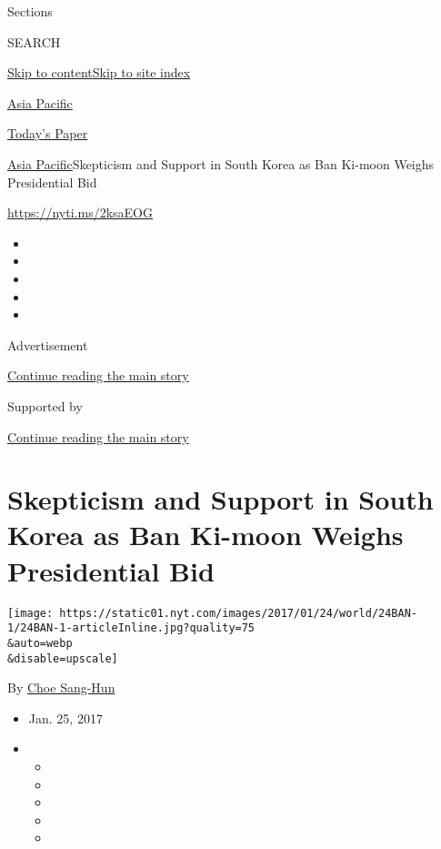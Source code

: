Sections

SEARCH

\protect\hyperlink{site-content}{Skip to
content}\protect\hyperlink{site-index}{Skip to site index}

\href{https://www.nytimes.com/section/world/asia}{Asia Pacific}

\href{https://myaccount.nytimes.com/auth/login?response_type=cookie\&client_id=vi}{}

\href{https://www.nytimes.com/section/todayspaper}{Today's Paper}

\href{/section/world/asia}{Asia Pacific}\textbar{}Skepticism and Support
in South Korea as Ban Ki-moon Weighs Presidential Bid

\url{https://nyti.ms/2ksaEOG}

\begin{itemize}
\item
\item
\item
\item
\item
\end{itemize}

Advertisement

\protect\hyperlink{after-top}{Continue reading the main story}

Supported by

\protect\hyperlink{after-sponsor}{Continue reading the main story}

\hypertarget{skepticism-and-support-in-south-korea-as-ban-ki-moon-weighs-presidential-bid}{%
\section{Skepticism and Support in South Korea as Ban Ki-moon Weighs
Presidential
Bid}\label{skepticism-and-support-in-south-korea-as-ban-ki-moon-weighs-presidential-bid}}

\texttt{[image: https://static01.nyt.com/images/2017/01/24/world/24BAN-1/24BAN-1-articleInline.jpg?quality=75\\\&auto=webp\\\&disable=upscale]}

By \href{http://www.nytimes.com/by/choe-sang-hun}{Choe Sang-Hun}

\begin{itemize}
\item
  Jan. 25, 2017
\item
  \begin{itemize}
  \item
  \item
  \item
  \item
  \item
  \end{itemize}
\end{itemize}


